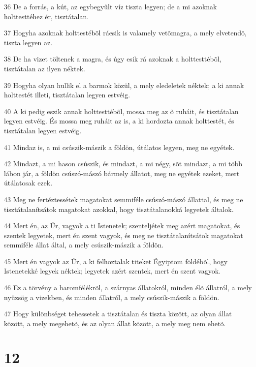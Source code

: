 \par 36 De a forrás, a kút, az egybegyûlt víz tiszta legyen; de a mi azoknak holttesttéhez ér, tisztátalan.
\par 37 Hogyha azoknak holttestébõl ráesik is valamely vetõmagra, a mely elvetendõ, tiszta legyen az.
\par 38 De ha vizet töltenek a magra, és úgy esik rá azoknak a holttesttébõl, tisztátalan az ilyen néktek.
\par 39 Hogyha olyan hullik el a barmok közül, a mely eledeletek néktek; a ki annak holttestét illeti, tisztátalan legyen estvéig.
\par 40 A ki pedig eszik annak holttesttébõl, mossa meg az õ ruháit, és tisztátalan legyen estvéig. És mossa meg ruháit az is, a ki hordozta annak holttestét, és tisztátalan legyen estvéig.
\par 41 Mindaz is, a mi csúszik-mászik a földön, útálatos legyen, meg ne egyétek.
\par 42 Mindazt, a mi hason csúszik, és mindazt, a mi négy, sõt mindazt, a mi több lábon jár, a földön csúszó-mászó bármely állatot, meg ne egyétek ezeket, mert útálatosak ezek.
\par 43 Meg ne fertéztessétek magatokat semmiféle csúszó-mászó állattal, és meg ne tisztátalanítsátok magatokat azokkal, hogy tisztátalanokká legyetek általok.
\par 44 Mert én, az Úr, vagyok a ti Istenetek; szenteljétek meg azért magatokat, és szentek legyetek, mert én szent vagyok, és meg ne tisztátalanítsátok magatokat semmiféle állat által, a mely csúszik-mászik a földön.
\par 45 Mert én vagyok az Úr, a ki felhoztalak titeket Égyiptom földébõl, hogy Istenetekké legyek néktek; legyetek azért szentek, mert én szent vagyok.
\par 46 Ez a törvény a baromfélékrõl, a szárnyas állatokról, minden élõ állatról, a mely nyüzsög a vizekben, és minden állatról, a mely csúszik-mászik a földön.
\par 47 Hogy különbséget tehessetek a tisztátalan és tiszta között, az olyan állat között, a mely megehetõ, és az olyan állat között, a mely meg nem ehetõ.

\chapter{12}

